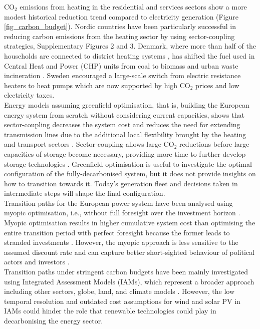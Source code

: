 \documentclass[5p]{elsarticle} %
\begin{document}
CO$_2$ emissions from heating in the residential and services sectors show a more modest historical reduction trend compared to electricity generation (Figure \ref{fig_carbon_budget}). Nordic countries have been particularly successful in reducing carbon emissions from the heating sector by using sector-coupling strategies, Supplementary Figures 2 and 3. Denmark, where more than half of the households are connected to district heating systems \cite{Gross_2019}, has shifted the fuel used in Central Heat and Power (CHP) units from coal to biomass and urban waste incineration \cite{DEA_2015}. Sweden encouraged a large-scale switch from electric resistance heaters to heat pumps \cite{Gross_2019} which are now supported by high CO$_2$ prices \cite{Carbon_pricing_2019} and low electricity taxes.\\ 

Energy models assuming greenfield optimisation, that is, building the European energy system from scratch without considering current capacities, shows that sector-coupling decreases the system cost and reduces the need for extending transmission lines due to the additional local flexibility brought by the heating and transport sectors \cite{Brown_2018}. Sector-coupling allows large CO$_2$ reductions before large capacities of storage become necessary, providing more time to further develop storage technologies \cite{Victoria_2019_storage}. Greenfield optimisation is useful to investigate the optimal configuration of the fully-decarbonised system, but it does not provide insights on how to transition towards it. Today's generation fleet and decisions taken in intermediate steps will shape the final configuration. \\

Transition paths for the European power system have been analysed using myopic optimisation, i.e., without full foresight over the investment horizon \cite{Bogdanov_2019, Plesmann_2017, Gerbaulet_2019, Poncelet_2016}. Myopic optimisation results in higher cumulative system cost than optimising the entire transition period with perfect foresight because the former leads to stranded investments \cite{Gerbaulet_2019, Heuberger_2018}. However, the myopic approach is less sensitive to the assumed discount rate and can capture better short-sighted behaviour of political actors and investors \cite{Poncelet_2016, Gerbaulet_2019}. \\

Transition paths under stringent carbon budgets have been mainly investigated using Integrated Assessment Models (IAMs), which represent a broader approach including other sectors, globe, land, and climate models \cite{Creutzig_2017, Rogelj_2018, Vanvuuren_2018, Grubler_2018}. However, the low temporal resolution and outdated cost assumptions for wind and solar PV \cite{Creutzig_2017, Krey_2019} in IAMs could hinder the role that renewable technologies could play in decarbonising the energy sector. \\
\end{document}
